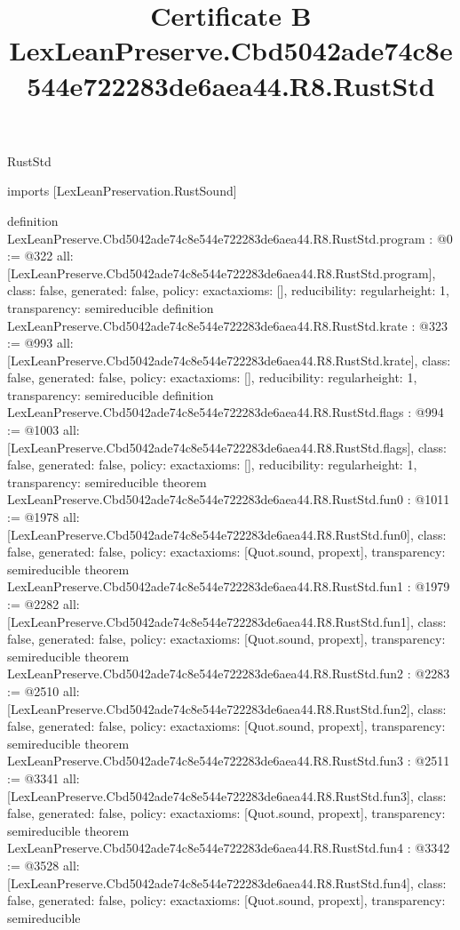 \begin{lexlean}{RustStd}
\title{Certificate B LexLeanPreserve.Cbd5042ade74c8e544e722283de6aea44.R8.RustStd}
\begin{coremodule}
imports [LexLeanPreservation.RustSound]

definition LexLeanPreserve.Cbd5042ade74c8e544e722283de6aea44.R8.RustStd.program : @0 := @322 {
  all: [LexLeanPreserve.Cbd5042ade74c8e544e722283de6aea44.R8.RustStd.program],
  class: false,
  generated: false,
  policy: exact{axioms: []},
  reducibility: regular{height: 1},
  transparency: semireducible
}
definition LexLeanPreserve.Cbd5042ade74c8e544e722283de6aea44.R8.RustStd.krate : @323 := @993 {
  all: [LexLeanPreserve.Cbd5042ade74c8e544e722283de6aea44.R8.RustStd.krate],
  class: false,
  generated: false,
  policy: exact{axioms: []},
  reducibility: regular{height: 1},
  transparency: semireducible
}
definition LexLeanPreserve.Cbd5042ade74c8e544e722283de6aea44.R8.RustStd.flags : @994 := @1003 {
  all: [LexLeanPreserve.Cbd5042ade74c8e544e722283de6aea44.R8.RustStd.flags],
  class: false,
  generated: false,
  policy: exact{axioms: []},
  reducibility: regular{height: 1},
  transparency: semireducible
}
theorem LexLeanPreserve.Cbd5042ade74c8e544e722283de6aea44.R8.RustStd.fun0 : @1011 := @1978 {
  all: [LexLeanPreserve.Cbd5042ade74c8e544e722283de6aea44.R8.RustStd.fun0],
  class: false,
  generated: false,
  policy: exact{axioms: [Quot.sound, propext]},
  transparency: semireducible
}
theorem LexLeanPreserve.Cbd5042ade74c8e544e722283de6aea44.R8.RustStd.fun1 : @1979 := @2282 {
  all: [LexLeanPreserve.Cbd5042ade74c8e544e722283de6aea44.R8.RustStd.fun1],
  class: false,
  generated: false,
  policy: exact{axioms: [Quot.sound, propext]},
  transparency: semireducible
}
theorem LexLeanPreserve.Cbd5042ade74c8e544e722283de6aea44.R8.RustStd.fun2 : @2283 := @2510 {
  all: [LexLeanPreserve.Cbd5042ade74c8e544e722283de6aea44.R8.RustStd.fun2],
  class: false,
  generated: false,
  policy: exact{axioms: [Quot.sound, propext]},
  transparency: semireducible
}
theorem LexLeanPreserve.Cbd5042ade74c8e544e722283de6aea44.R8.RustStd.fun3 : @2511 := @3341 {
  all: [LexLeanPreserve.Cbd5042ade74c8e544e722283de6aea44.R8.RustStd.fun3],
  class: false,
  generated: false,
  policy: exact{axioms: [Quot.sound, propext]},
  transparency: semireducible
}
theorem LexLeanPreserve.Cbd5042ade74c8e544e722283de6aea44.R8.RustStd.fun4 : @3342 := @3528 {
  all: [LexLeanPreserve.Cbd5042ade74c8e544e722283de6aea44.R8.RustStd.fun4],
  class: false,
  generated: false,
  policy: exact{axioms: [Quot.sound, propext]},
  transparency: semireducible
}
\end{coremodule}
\end{lexlean}
